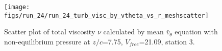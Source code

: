 \begin{figure}[H]
\centering
\texttt{[image: figs/run\_24/run\_24\_turb\_visc\_by\_vtheta\_vs\_r\_meshscatter]}
\caption{Scatter plot of total viscosity $\nu$ calculated by mean $\bar{v}_{\theta}$ equation with non-equilibrium pressure at $z/c$=7.75, $V_{free}$=21.09, station 3.}
\label{fig:run_24_turb_visc_by_vtheta_vs_r_meshscatter}
\end{figure}


